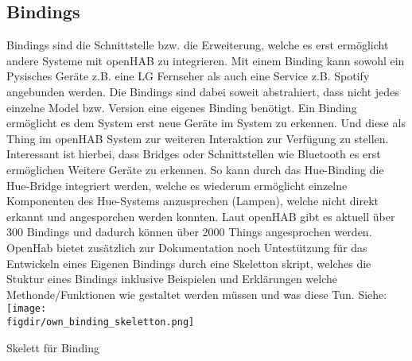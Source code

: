 \subsection{Bindings}
Bindings sind die Schnittstelle bzw. die Erweiterung, welche es erst ermöglicht andere Systeme mit openHAB zu integrieren. Mit einem Binding kann sowohl ein Pysisches Geräte z.B. eine LG Fernseher als auch eine Service z.B. Spotify angebunden werden. Die Bindings sind dabei soweit abstrahiert, dass nicht jedes einzelne Model bzw. Version eine eigenes Binding benötigt.
Ein Binding ermöglicht es dem System erst neue Geräte im System zu erkennen. Und diese als Thing im openHAB System zur weiteren Interaktion zur Verfügung zu stellen. Interessant ist hierbei, dass Bridges oder Schnittstellen wie Bluetooth es erst ermöglichen Weitere Geräte zu erkennen. So kann durch das Hue-Binding die Hue-Bridge integriert werden, welche es wiederum ermöglicht einzelne Komponenten des Hue-Systems anzusprechen (Lampen), welche nicht direkt erkannt und angesporchen werden konnten.
Laut openHAB gibt es aktuell über 300 Bindings und dadurch können über 2000 Things angesprochen werden.
OpenHab bietet zusätzlich zur Dokumentation noch Untestützung für das Entwickeln eines Eigenen Bindings durch eine Skeletton skript, welches die Stuktur eines Bindings inklusive Beispielen und Erklärungen welche Methonde/Funktionen wie gestaltet werden müssen und was diese Tun. Siehe:
\captionsetup{type=figure}
\texttt{[image: \\figdir/own\_binding\_skeletton.png]}
\caption{Skelett für Binding \label{fig:own_binding_skeletton}}


